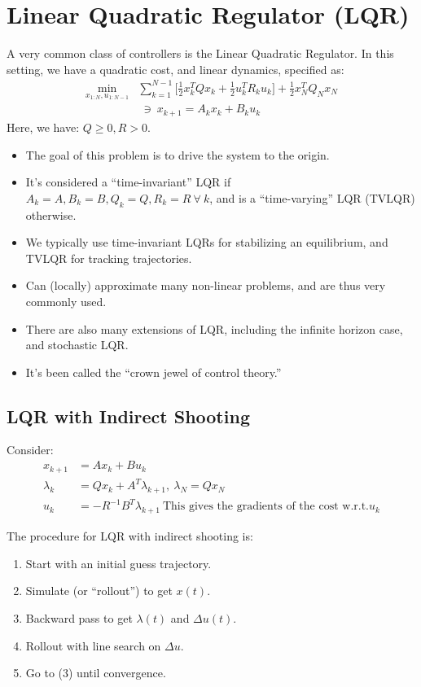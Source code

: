 \section{Linear Quadratic Regulator (LQR)}
A very common class of controllers is the Linear Quadratic Regulator. In this setting, we have a quadratic cost, and linear dynamics, specified as: 
\begin{align}
    \min_{x_{1:N}, u_{1:N-1}} &\sum_{k=1}^{N-1} \Big[ \frac{1}{2} x_k^T Q x_k + \frac{1}{2} u_k^T R_k u_k  \Big] + \frac{1}{2} x_N^T Q_N x_N \\
    & \ \ni \ x_{k+1} = A_k x_k + B_k u_k 
\end{align}
Here, we have: $Q \geq 0, R > 0$. 
\begin{itemize}
    \item The goal of this problem is to drive the system to the origin.
    \item It's considered a ``time-invariant'' LQR if $A_k=A, B_k=B, Q_k=Q, R_k=R \ \forall \ k$, and is a ``time-varying'' LQR (TVLQR) otherwise. 
    \item We typically use time-invariant LQRs for stabilizing an equilibrium, and TVLQR for tracking trajectories.
    \item Can (locally) approximate many non-linear problems, and are thus very commonly used. 
    \item There are also many extensions of LQR, including the infinite horizon case, and stochastic LQR. 
    \item It's been called the ``crown jewel of control theory.''
\end{itemize}

\subsection{LQR with Indirect Shooting}
Consider: 
\begin{align}
    x_{k+1} &= A x_k + B u_k \\
    \lambda_k &= Q x_k + A^T \lambda_{k+1}, \ \lambda_N = Q x_N \\
    u_{k} &= -R^{-1} B^T \lambda_{k+1} \ \textrm{This gives the gradients of the cost w.r.t.} u_k
\end{align}

The procedure for LQR with indirect shooting is: 
\begin{enumerate}
    \item Start with an initial guess trajectory. 
    \item Simulate (or ``rollout'') to get $x(t)$.
    \item Backward pass to get $\lambda(t)$ and $\Delta u(t)$.
    \item Rollout with line search on $\Delta u$.
    \item Go to (3) until convergence.
\end{enumerate}

